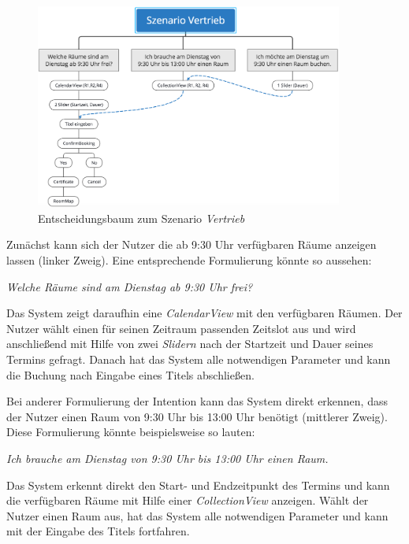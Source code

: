 \begin{figure}[H]
    \centering
    \includegraphics[width=0.9\textwidth]{bilder/SzenarioVertriebMindMap.png}
    \caption{Entscheidungsbaum zum Szenario \textit{Vertrieb}}
    \label{fig:decision-tree-vertrieb}
\end{figure}

Zunächst kann sich der Nutzer die ab 9:30 Uhr verfügbaren Räume anzeigen lassen (linker Zweig). Eine entsprechende Formulierung könnte so aussehen:

\begin{center}
    \textit{Welche Räume sind am Dienstag ab 9:30 Uhr frei?}
\end{center}

Das System zeigt daraufhin eine \textit{CalendarView} mit den verfügbaren Räumen. Der Nutzer wählt einen für seinen Zeitraum passenden Zeitslot aus und wird anschließend mit Hilfe von zwei \textit{Slidern} nach der Startzeit und Dauer seines Termins gefragt. Danach hat das System alle notwendigen Parameter und kann die Buchung nach Eingabe eines Titels abschließen.

Bei anderer Formulierung der Intention kann das System direkt erkennen, dass der Nutzer einen Raum von 9:30 Uhr bis 13:00 Uhr benötigt (mittlerer Zweig). Diese Formulierung könnte beispielsweise so lauten:

\begin{center}
    \textit{Ich brauche am Dienstag von 9:30 Uhr bis 13:00 Uhr einen Raum.}
\end{center}

Das System erkennt direkt den Start- und Endzeitpunkt des Termins und kann die verfügbaren Räume mit Hilfe einer \textit{CollectionView} anzeigen. Wählt der Nutzer einen Raum aus, hat das System alle notwendigen Parameter und kann mit der Eingabe des Titels fortfahren. 

